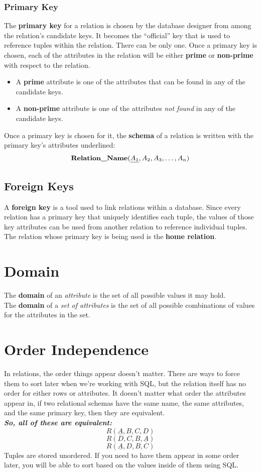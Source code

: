 \documentclass{report}
\begin{document}
\subsubsection*{Primary Key}
    The \textbf{primary key} for a relation is chosen by the database designer from among the relation's candidate keys. It becomes the ``official'' key that is used to reference tuples within the relation. There can be only one.
\bigbreak \noindent
Once a primary key is chosen, each of the attributes in the relation will be either \textbf{prime} or \textbf{non-prime} with respect to the relation.
\begin{itemize}
    \item A \textbf{prime} attribute is one of the attributes that can be found in any of the candidate keys.
    \item A \textbf{non-prime} attribute is one of the attributes \textit{not found} in any of the candidate keys.
\end{itemize}
Once a primary key is chosen for it, the \textbf{schema} of a relation is written with the primary key's attributes underlined:
$$\text{\textbf{Relation\_Name}}(\underline{A_1}, A_2, A_3,\ldots, A_n)$$
\subsection*{Foreign Keys}
A \textbf{foreign key} is a tool used to link relations within a database. Since every relation has a primary key that uniquely identifies each tuple, the values of those key attributes can be used from another relation to reference individual tuples.
\bigbreak \noindent
The relation whose primary key is being used is the \textbf{home relation}.
\section{Domain}
The \textbf{domain} of an \textit{attribute} is the set of all possible values it may hold. \\
The \textbf{domain} of a \textit{set of attributes} is the set of all possible combinations of values for the attributes in the set.
\section{Order Independence}
In relations, the order things appear doesn't matter. There are ways to force them to sort later when we're working with SQL, but the relation itself has no order for either rows or attributes.
\bigbreak \noindent
It doesn't matter what order the attributes appear in, if two relational schemas have the same name, the same attributes, and the same primary key, then they are equivalent. \\
\textit{\textbf{So, all of these are equivalent:}}
$$ R(\underline{A},B,C,D)$$
$$ R(D,C,B,\underline{A})$$
$$ R(\underline{A},D,B,C)$$
Tuples are stored unordered. If you need to have them appear in some order later, you will be able to sort based on the values inside of them using SQL.
\end{document}
